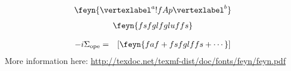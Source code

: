 \documentclass[11pt,a4paper]{scrreprt}
\begin{document}
\begin{align*}
\feyn{\vertexlabel^a !{fA}p \vertexlabel^b}
\end{align*}
\begin{align*}
\feyn{fs f gl f glu f fs}
\end{align*}

\def\bracket#1{\langle #1 \rangle}
 \begin{eqnarray*}
 -i\Sigma_{\rm ope} &=&
     \left[ \feyn{faf + fsfglffs + \cdots} \right] %
 \end{eqnarray*}
More information here: \url{http://texdoc.net/texmf-dist/doc/fonts/feyn/feyn.pdf}
\end{document}
